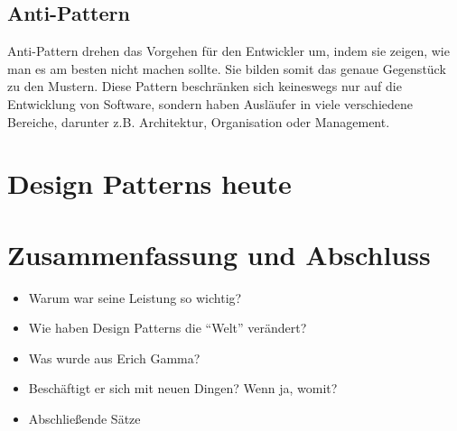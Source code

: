 \documentclass[fontsize=11pt,a4paper,final]{scrreprt}[2003/01/01]
\begin{document}
\section{Anti-Pattern}
Anti-Pattern drehen das Vorgehen für den Entwickler um, indem sie zeigen, wie man es am besten nicht machen sollte. Sie bilden somit das genaue Gegenstück zu den Mustern. Diese Pattern beschränken sich keineswegs nur auf die Entwicklung von Software, sondern haben Ausläufer in viele verschiedene Bereiche, darunter z.B. Architektur, Organisation oder Management. \cite{AntiPatternsCatalog}

\chapter{Design Patterns heute}\label{se:Design Patterns heute}


\chapter{Zusammenfassung und Abschluss}\label{se:Zusammenfassung und Abschluss}
\begin{itemize} 
	\item Warum war seine Leistung so wichtig?
	\item Wie haben Design Patterns die \enquote{Welt} verändert?
	\item Was wurde aus Erich Gamma?
	\item Beschäftigt er sich mit neuen Dingen? Wenn ja, womit?
	\item Abschließende Sätze
\end{itemize}

\newpage

\end{document}
